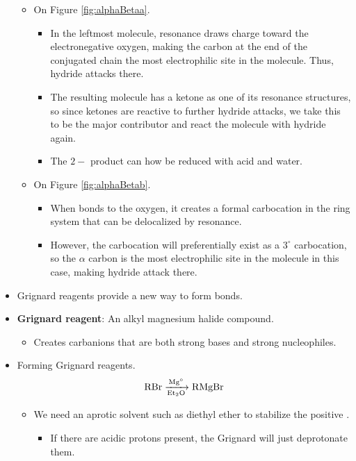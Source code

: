 \documentclass[../notes.tex]{subfiles}
\begin{document}
\begin{itemize}
\begin{itemize}
        \item On Figure \ref{fig:alphaBetaa}.
        \begin{itemize}
            \item In the leftmost molecule, resonance draws charge toward the electronegative oxygen, making the carbon at the end of the conjugated chain the most electrophilic site in the molecule. Thus, hydride attacks there.
            \item The resulting molecule has a ketone as one of its resonance structures, so since ketones are reactive to further hydride attacks, we take this to be the major contributor and react the molecule with hydride again.
            \item The $2-$ product can how be reduced with acid and water.
        \end{itemize}
        \item On Figure \ref{fig:alphaBetab}.
        \begin{itemize}
            \item When  bonds to the oxygen, it creates a formal carbocation in the ring system that can be delocalized by resonance.
            \item However, the carbocation will preferentially exist as a $3^\circ$ carbocation, so the $\alpha$ carbon is the most electrophilic site in the molecule in this case, making hydride attack there.
        \end{itemize}
    \end{itemize}
    \item Grignard reagents provide a new way to form  bonds.
    \item \textbf{Grignard reagent}: An alkyl magnesium halide compound.
    \begin{itemize}
        \item Creates carbanions that are both strong bases and strong nucleophiles.
    \end{itemize}
    \item Forming Grignard reagents.
    \begin{equation*}
        \ce{RBr ->[Mg${}^\circ$][Et2O] RMgBr}
    \end{equation*}
    \begin{itemize}
        \item We need an aprotic solvent such as diethyl ether to stabilize the positive .
        \begin{itemize}
            \item If there are acidic protons present, the Grignard will just deprotonate them.

\end{itemize}
\end{itemize}
\end{itemize}
\end{document}
